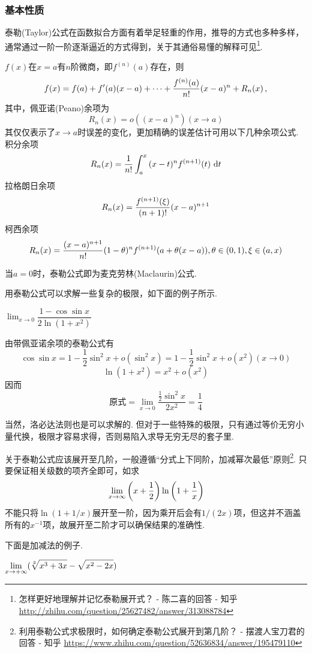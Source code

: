 \subsubsection{基本性质}
泰勒(Taylor)公式在函数拟合方面有着举足轻重的作用，推导的方式也多种多样，通常通过一阶一阶逐渐逼近的方式得到，关于其通俗易懂的解释可见\footnote{怎样更好地理解并记忆泰勒展开式？ - 陈二喜的回答 - 知乎 \url{http://zhihu.com/question/25627482/answer/313088784}}.
\begin{theorem}[带余项的泰勒公式]
$f(x)$在$x=a$有$n$阶微商，即$f^{(n)}(a)$存在，则
\[f(x)=f(a)+f'(a)(x-a)+\cdots+\dfrac{f^{(n)}(a)}{n!}(x-a)^n+R_n(x)\,,\]
其中，佩亚诺(Peano)余项为
\[R_n(x)=o((x-a)^n)(x\to a)\]
其仅仅表示了$x\to a$时误差的变化，更加精确的误差估计可用以下几种余项公式. 积分余项
\[R_n(x)=\dfrac{1}{n!}\displaystyle\int_{a}^{x}{(x-t)^nf^{(n+1)}(t)}\,\,\mathrm{d} t\]
拉格朗日余项%
\[R_n(x)=\dfrac{f^{(n+1)}(\xi)}{(n+1)!}(x-a)^{n+1}\]
柯西余项%
\[R_n(x)=\dfrac{(x-a)^{n+1}}{n!}(1-\theta)^nf^{(n+1)}(a+\theta(x-a)),\theta\in(0,1),\xi\in(a,x)\]
\end{theorem}
当$a=0$时，泰勒公式即为麦克劳林(Maclaurin)公式.
\par 用泰勒公式可以求解一些复杂的极限，如下面的例子所示.
\begin{example}
$\displaystyle\lim_{x\to 0}\dfrac{1-\cos\sin x}{2\ln(1+x^2)}$
\end{example}
\begin{analysis}
由带佩亚诺余项的泰勒公式有
\[\cos\sin x=1-\dfrac{1}{2}\sin^2 x+o(\sin^2 x)=1-\dfrac{1}{2}\sin^2x+o(x^2)(x\to 0)\]
\[\ln(1+x^2)=x^2+o(x^2)\]
因而
\[\text{原式}=\lim_{x\to 0}\dfrac{\frac{1}{2}\sin^2x}{2x^2}=\dfrac{1}{4}\]
\end{analysis}
\par 当然，洛必达法则也是可以求解的. 但对于一些特殊的极限，只有通过等价无穷小量代换，极限才容易求得，否则易陷入求导无穷无尽的套子里.
\par 关于泰勒公式应该展开至几阶，一般遵循“分式上下同阶，加减幂次最低”原则\footnote{利用泰勒公式求极限时，如何确定泰勒公式展开到第几阶？ - 摆渡人宝刀君的回答 - 知乎 \url{https://www.zhihu.com/question/52636834/answer/195479110}}.
只要保证相关级数的项齐全即可，如求
\[\lim_{x\to \infty}\left(x+\dfrac{1}{2}\right)\ln\left(1+\dfrac{1}{x}\right)\]
不能只将$\ln(1+1/x)$展开至一阶，因为乘开后会有$1/(2x)$项，但这并不涵盖所有的$x^{-1}$项，故展开至二阶才可以确保结果的准确性.
\par 下面是加减法的例子.
\begin{example}
$\displaystyle\lim_{x\to+\infty}(\sqrt[3]{x^3+3x}-\sqrt{x^2-2x})$
\end{example}
